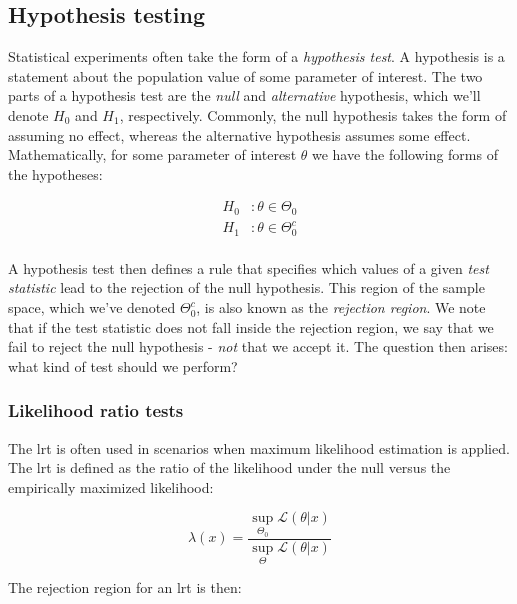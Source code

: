 \documentclass{report}
\begin{document}
\subsection{Hypothesis testing}

Statistical experiments often take the form of a \textit{hypothesis test}. A hypothesis is a statement about the population value of some parameter of interest. The two parts of a hypothesis test are the \textit{null} and \textit{alternative} hypothesis, which we'll denote $H_0$ and $H_1$, respectively. Commonly, the null hypothesis takes the form of assuming no effect, whereas the alternative hypothesis assumes some effect. Mathematically, for some parameter of interest $\theta$ we have the following forms of the hypotheses:

\begin{equation}\label{eq:hypotheses}
    \begin{aligned}
        H_0 &\colon \theta \in \Theta_0 \\
        H_1 &\colon \theta \in \Theta_0^c \\
    \end{aligned}
\end{equation}

A hypothesis test then defines a rule that specifies which values of a given \textit{test statistic} lead to the rejection of the null hypothesis. This region of the sample space, which we've denoted $\Theta_0^c$, is also known as the \textit{rejection region}. We note that if the test statistic does not fall inside the rejection region, we say that we fail to reject the null hypothesis - \textit{not} that we accept it. The question then arises: what kind of test should we perform?

\subsubsection{Likelihood ratio tests}

The \gls{lrt} is often used in scenarios when maximum likelihood estimation is applied. The \gls{lrt} is defined as the ratio of the likelihood under the null versus the empirically maximized likelihood:

\begin{equation}\label{eq:lrt-form}
    \lambda(x) = \frac{\sup_{\Theta_0} \mathcal{L}(\theta|x)}{\sup_{\Theta} \mathcal{L}(\theta|x)}
\end{equation}

The rejection region for an \gls{lrt} is then:
\end{document}
